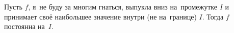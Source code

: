 \label{gnat}
    Пусть $f$, я~не буду за многим гнаться, выпукла вниз на~промежутке $I$ и принимает своё наибольшее значение внутри (не на~границе) $I$.
     Тогда $f$ постоянна на~$I$.

